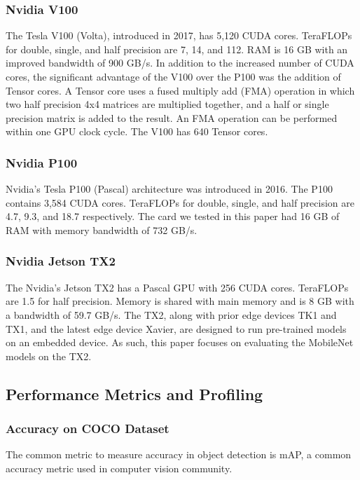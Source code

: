 \documentclass[conference]{IEEEtran}
\begin{document}
\subsubsection{Nvidia V100}

The Tesla V100 (Volta), introduced in 2017, has 5,120 CUDA cores. TeraFLOPs for double, single, and half precision are 7, 14, and 112. RAM is 16 GB with an improved bandwidth of 900 GB/s. In addition to the increased number of CUDA cores, the significant advantage of the V100 over the P100 was the addition of Tensor cores. A Tensor core uses a fused multiply add (FMA) operation in which two half precision 4x4 matrices are multiplied together, and a half or single precision matrix is added to the result. An FMA operation can be performed within one GPU clock cycle. The V100 has 640 Tensor cores.

\subsubsection{Nvidia P100}

Nvidia's Tesla P100 (Pascal) architecture was introduced in 2016. The P100 contains 3,584 CUDA cores. TeraFLOPs for double, single, and half precision are 4.7, 9.3, and 18.7 respectively. The card we tested in this paper had 16 GB of RAM with memory bandwidth of  732 GB/s.


\subsubsection{Nvidia Jetson TX2}

The Nvidia's Jetson TX2 has a Pascal GPU with 256 CUDA cores. TeraFLOPs are 1.5 for half precision. Memory is shared with main memory and is 8 GB with a bandwidth of 59.7 GB/s.
The TX2, along with prior edge devices TK1 and TX1, and the latest edge device Xavier, are designed to run pre-trained models on an embedded device. As such, this paper focuses on evaluating the MobileNet models on the TX2.

\subsection{Performance Metrics and Profiling}

\subsubsection{Accuracy on COCO Dataset}
The common metric to measure accuracy in object detection is mAP, a common accuracy metric used in computer vision community.
\end{document}
